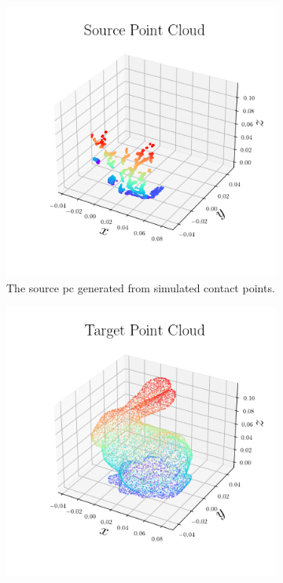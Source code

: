 \begin{figure}[!h]
	\centering
	\begin{subfigure}[b]{0.3\textwidth}
		\centering
		\includegraphics[width=\textwidth]{chapters/1-tactile-perception/fig/matplotlib/pc_source.png}
		\caption{The source \gls{pc} generated from simulated contact points.}
		\label{fig:pc-source}
	\end{subfigure}
	\begin{subfigure}[b]{0.3\textwidth}
		\centering
		\includegraphics[width=\textwidth]{chapters/1-tactile-perception/fig/matplotlib/pc_target.png}

\end{subfigure}
\end{figure}
